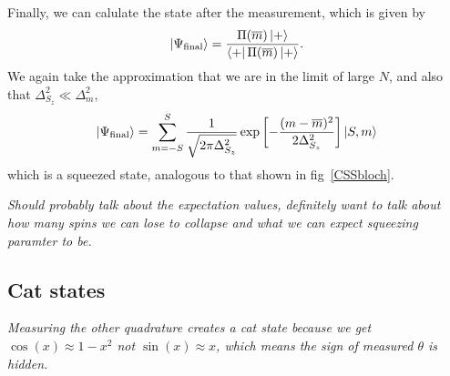 Finally, we can calulate the state after the measurement, which is given
by~\cite{}
%
\begin{equation}
  \ket{\Psi_\text{final}} =
  \frac{\Pi(\overline{m})\ket{+}}{\bra{+}\Pi(\overline{m})\ket{+}}.
\end{equation}
%
We again take the approximation that we are in the limit of large $N$, and also
that $\Delta_{S_z}^2 \ll \Delta_m^2$,
%
\begin{equation}
  \ket{\Psi_\text{final}} = \sum_{m=-S}^S\frac{1}{\sqrt{2\pi\Delta_{S_z}^2}}
  \exp\left[-\frac{(m - \overline{m})^2}{2\Delta_{S_z}^2}\right] \ket{S,m}
\end{equation}
%
which is a squeezed state, analogous to that shown in fig~\ref{CSSbloch}.

\emph{Should probably talk about the expectation values, definitely want to
talk about how many spins we can lose to collapse and what we can expect
squeezing paramter to be.}

\subsection{Cat states}


\emph{Measuring the other quadrature creates a cat state because we get
$\cos(x) \approx 1 - x^2$ not $\sin(x)\approx x$, which means the sign of
measured $\theta$ is hidden.}




